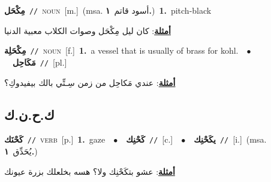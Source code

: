 \documentclass[10pt,a4paper,twoside]{article} %
\begin{document}
\begin{multicols}{2}
{\setlength\topsep{0pt}\textbf{\foreignlanguage{arabic}{مِكْحَل}}\ {\color{gray}\texttt{//}\color{black}}\ \textsc{noun}\ [m.]\ \color{gray}(msa. \foreignlanguage{arabic}{أسود قاتم}~\foreignlanguage{arabic}{\textbf{١.}})\color{black}\ \textbf{1.}~pitch-black\  \begin{flushright}\color{gray}\foreignlanguage{arabic}{\textbf{\underline{\foreignlanguage{arabic}{أمثلة}}}: كان ليل مِكْحَل وصوات الكلاب معبية الدنيا}\end{flushright}\color{black}} \vspace{2mm}

{\setlength\topsep{0pt}\textbf{\foreignlanguage{arabic}{مِكْحَلِة}}\ {\color{gray}\texttt{//}\color{black}}\ \textsc{noun}\ [f.]\ \textbf{1.}~a vessel that is usually of brass for kohl.\ \ $\bullet$\ \ \setlength\topsep{0pt}\textbf{\foreignlanguage{arabic}{مَكَاحِل}}\ {\color{gray}\texttt{//}\color{black}}\ [pl.]\  \begin{flushright}\color{gray}\foreignlanguage{arabic}{\textbf{\underline{\foreignlanguage{arabic}{أمثلة}}}: عندي مَكاحِل من زمن سِـتِّي بالك بيفيدوكِ؟}\end{flushright}\color{black}} \vspace{2mm}

\vspace{-3mm}
\subsection*{\color{blue}\foreignlanguage{arabic}{ك.ح.ن.ك}\color{blue}{}} 

{\setlength\topsep{0pt}\textbf{\foreignlanguage{arabic}{كَحْنَك}}\ {\color{gray}\texttt{//}\color{black}}\ \textsc{verb}\ [p.]\ \textbf{1.}~gaze\ \ $\bullet$\ \ \setlength\topsep{0pt}\textbf{\foreignlanguage{arabic}{كَحْنِك}}\ {\color{gray}\texttt{//}\color{black}}\ [c.]\ \ $\bullet$\ \ \setlength\topsep{0pt}\textbf{\foreignlanguage{arabic}{يكَحْنِك}}\ {\color{gray}\texttt{//}\color{black}}\ [i.]\ \color{gray}(msa. \foreignlanguage{arabic}{يُحَدِّق}~\foreignlanguage{arabic}{\textbf{١.}})\color{black}\  \begin{flushright}\color{gray}\foreignlanguage{arabic}{\textbf{\underline{\foreignlanguage{arabic}{أمثلة}}}: عشو بتكَحْنِك ولا؟ هسه بخلعلك بزرة عيونك}\end{flushright}\color{black}} \vspace{2mm}


\end{multicols}
\end{document}
